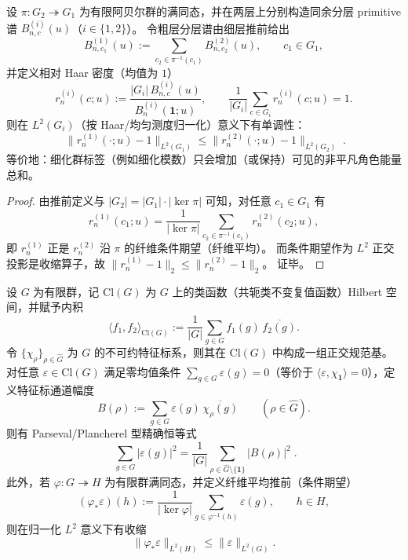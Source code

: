 \begin{corollary}\label{cor:kernel-chebotarev-L2-monotone}
设 \(\pi:G_2\twoheadrightarrow G_1\) 为有限阿贝尔群的满同态，并在两层上分别构造同余分层 primitive 谱 \(B^{(i)}_{n,c}(u)\)（\(i\in\{1,2\}\)）。
令粗层分层谱由细层推前给出
\[
B^{(1)}_{n,c_1}(u):=\sum_{c_2\in \pi^{-1}(c_1)}B^{(2)}_{n,c_2}(u),
\qquad c_1\in G_1,
\]
并定义相对 Haar 密度（均值为 \(1\)）
\[
r^{(i)}_{n}(c;u):=\frac{|G_i|\,B^{(i)}_{n,c}(u)}{B^{(i)}_{n}(\mathbf{1};u)},
\qquad
\frac{1}{|G_i|}\sum_{c\in G_i}r^{(i)}_{n}(c;u)=1.
\]
则在 \(L^2(G_i)\)（按 Haar/均匀测度归一化）意义下有单调性：
\[
\boxed{\;
\bigl\|r^{(1)}_{n}(\cdot;u)-1\bigr\|_{L^2(G_1)}
\le
\bigl\|r^{(2)}_{n}(\cdot;u)-1\bigr\|_{L^2(G_2)}\; }.
\]
等价地：细化群标签（例如细化模数）只会增加（或保持）可见的非平凡角色能量总和。
\end{corollary}
\begin{proof}
由推前定义与 \(|G_2|=|G_1|\cdot|\ker\pi|\) 可知，对任意 \(c_1\in G_1\) 有
\[
r^{(1)}_{n}(c_1;u)
=\frac{1}{|\ker\pi|}\sum_{c_2\in\pi^{-1}(c_1)}r^{(2)}_{n}(c_2;u),
\]
即 \(r^{(1)}_{n}\) 正是 \(r^{(2)}_{n}\) 沿 \(\pi\) 的纤维条件期望（纤维平均）。
而条件期望作为 \(L^2\) 正交投影是收缩算子，故
\(
\|r^{(1)}_{n}-1\|_{2}\le \|r^{(2)}_{n}-1\|_{2}
\)。
证毕。
\end{proof}

\begin{proposition}\label{prop:kernel-chebotarev-plancherel-nonabelian}
设 \(G\) 为有限群，记 \(\mathrm{Cl}(G)\) 为 \(G\) 上的类函数（共轭类不变复值函数）Hilbert 空间，并赋予内积
\[
\langle f_1,f_2\rangle_{\mathrm{Cl}(G)}
:=\frac{1}{|G|}\sum_{g\in G} f_1(g)\,\overline{f_2(g)}.
\]
令 \(\{\chi_\rho\}_{\rho\in\widehat G}\) 为 \(G\) 的不可约特征标系，则其在 \(\mathrm{Cl}(G)\) 中构成一组正交规范基。
对任意 \(\varepsilon\in \mathrm{Cl}(G)\) 满足零均值条件 \(\sum_{g\in G}\varepsilon(g)=0\)（等价于 \(\langle \varepsilon,\chi_{\mathbf{1}}\rangle=0\)），定义特征标通道幅度
\[
B(\rho):=\sum_{g\in G}\varepsilon(g)\,\overline{\chi_\rho(g)}
\qquad(\rho\in\widehat G).
\]
则有 Parseval/Plancherel 型精确恒等式
\[
\boxed{\;
\sum_{g\in G}\bigl|\varepsilon(g)\bigr|^2
=\frac{1}{|G|}\sum_{\rho\in\widehat G\setminus\{\mathbf{1}\}}\bigl|B(\rho)\bigr|^2\; }.
\]
此外，若 \(\varphi:G\twoheadrightarrow H\) 为有限群满同态，并定义纤维平均推前（条件期望）
\[
(\varphi_\ast\varepsilon)(h):=\frac{1}{|\ker\varphi|}\sum_{g\in \varphi^{-1}(h)}\varepsilon(g),
\qquad h\in H,
\]
则在归一化 \(L^2\) 意义下有收缩
\[
\bigl\|\varphi_\ast\varepsilon\bigr\|_{L^2(H)}
\le
\bigl\|\varepsilon\bigr\|_{L^2(G)}.
\]
\end{proposition}

